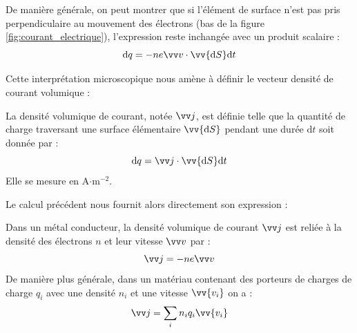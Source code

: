 \documentclass[11pt,fleqn]{book} %
\newcommand{\dd}{\mathrm{d}}
\begin{document}

De manière générale, on peut montrer que si l'élément de surface n'est pas pris perpendiculaire au mouvement des électrons (bas de la figure \ref{fig:courant_electrique}), l'expression reste inchangée avec un produit scalaire :
\begin{equation}
    \dd q = - n e \vv v \cdot \vv{\dd S} \dd t
\end{equation}

Cette interprétation microscopique nous amène à définir le vecteur densité de courant volumique :

\begin{definition}
    La densité volumique de courant, notée $\vv j$, est définie telle que la quantité de charge traversant une surface élémentaire $\vv{\dd S}$ pendant une durée $\dd t$ soit donnée par :
    \begin{equation}
        \dd q = \vv j \cdot \vv{\dd S} \dd t
    \end{equation}
    Elle se mesure en A$\cdot$m$^{-2}$.
\end{definition}

Le calcul précédent nous fournit alors directement son expression :

\begin{proposition}
    Dans un métal conducteur, la densité volumique de courant $\vv j$ est reliée à la densité des électrons $n$ et leur vitesse $\vv v$ par :
    \begin{equation}
        \vv j = - n e \vv v
    \end{equation}
    De manière plus générale, dans un matériau contenant des porteurs de charges de charge $q_i$ avec une densité $n_i$ et une vitesse $\vv{v_i}$ on a :
    \begin{equation}
        \vv j  = \sum_i n_i q_i \vv{v_i}
    \end{equation}
\end{proposition}
\end{document}
